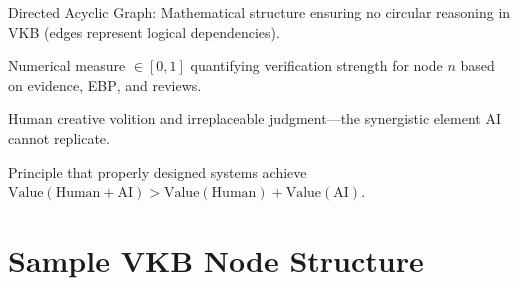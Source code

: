 \documentclass[11pt,a4paper]{article}
\theoremstyle{definition}
\theoremstyle{remark}
\newcommand{\VKB}{\textsc{VKB}}
\newcommand{\EBP}{\textsc{EBP}}
\begin{document}
\begin{description}[leftmargin=4cm,style=nextline]
    \item[DAG] Directed Acyclic Graph: Mathematical structure ensuring no circular reasoning in \VKB{} (edges represent logical dependencies).
    
    \item[Confidence Score $\Phi(n)$] Numerical measure $\in [0,1]$ quantifying verification strength for node $n$ based on evidence, \EBP{}, and reviews.
    
    \item[$\epsilon$ (Epsilon)] Human creative volition and irreplaceable judgment—the synergistic element AI cannot replicate.
    
    \item[Synergistic Co-Creation] Principle that properly designed systems achieve $\text{Value}(\text{Human}+\text{AI}) > \text{Value}(\text{Human}) + \text{Value}(\text{AI})$.
\end{description}

\section{Sample VKB Node Structure}
\end{document}
